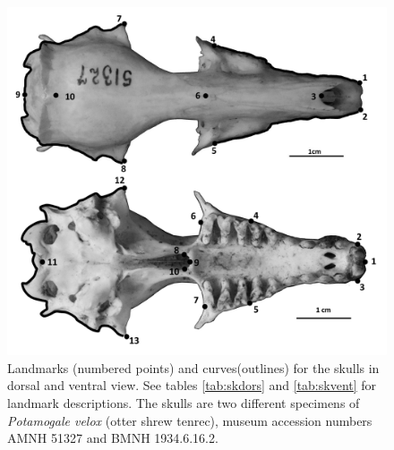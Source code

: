 \begin{figure}[!htbp]
	\centering
	\includegraphics[width=1\linewidth]{Methods/figures/Skdors+Skvent_combined_BW.png}
	\caption[Skulls: dorsal and ventral landmarks]
	{Landmarks (numbered points) and curves(outlines) for the skulls in dorsal and ventral view. See tables \ref{tab:skdors} and \ref{tab:skvent} for landmark descriptions. The skulls are two different specimens of \textit{Potamogale velox} (otter shrew tenrec), museum accession numbers AMNH 51327 and BMNH 1934.6.16.2. }
	\label{fig:skdors_skvent}
\end{figure}



\begin{table}[h]
	\caption[Skulls: dorsal landmarks]
		{Descriptions of the landmarks (points) and curves (semilandmarks) for the skulls in dorsal view (figure
		\ref{fig:skdors_skvent})} 
	
	\label{tab:skdors}
\end{table}

\begin{table}[!htb] %
\caption[Skulls: ventral landmarks]
		{Descriptions of the landmarks (points) and curves (semilandmarks) for the skulls in ventral view (figure \ref{fig:skdors_skvent}).} 

\label{tab:skvent}
\end{table}
\newpage
